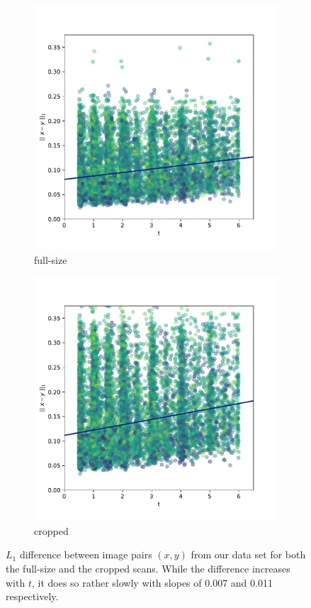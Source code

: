 \begin{figure}[h]
	\centering
	\begin{subfigure}{0.48\textwidth}
		\includegraphics[width=0.9\linewidth, trim={10 30 30 30}, clip]{images/l1_diff_plots/brains} 
		\caption{full-size}
	\end{subfigure}
	\begin{subfigure}{0.48\textwidth}
		\includegraphics[width=0.9\linewidth, trim={10 30 30 30}, clip]{images/l1_diff_plots/slice.pdf}
		\caption{cropped}
	\end{subfigure}
	 
	\caption{$L_1$ difference between image pairs $(x, y)$ from our data set for both the full-size and the cropped scans. While the difference increases with $t$, it does so rather slowly with slopes of 0.007 and 0.011 respectively.}
	\label{fig:l1plots}
\end{figure}

